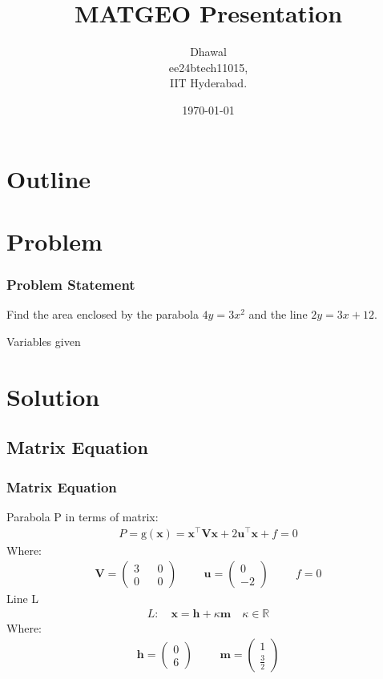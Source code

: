 \documentclass{beamer}
\title{MATGEO Presentation}
\author{Dhawal \\ ee24btech11015,\\IIT Hyderabad.}
\date{\today}
\providecommand{\brak}[1]{\ensuremath{\left(#1\right)}}
\theoremstyle{remark}
\newcommand{\myvec}[1]{\ensuremath{\begin{pmatrix}#1\end{pmatrix}}}
\let\vec\mathbf
\numberwithin{equation}{section}
\begin{document}
\begin{frame}
\titlepage
\end{frame}

\section*{Outline}
\begin{frame}
\tableofcontents
\end{frame}
\section{Problem}
\begin{frame}
\frametitle{Problem Statement}
%
 Find the area enclosed by the parabola $4y = 3x^2$ and the line $2y = 3x+12$. 
 \begin{table}[h!]    
  \centering
  
  \caption{Variables given}
  \label{tab 1.4.9.2}
\end{table}


\end{frame}

\section{Solution}
\subsection{Matrix Equation}
\begin{frame}
\frametitle{Matrix Equation}
Parabola P in terms of matrix:
\begin{align}
P=\text{g}\brak{\vec{x}}=\vec{x}^{\top}\vec{V}\vec{x}+2\vec{u}^{\top}\vec{x}+f=0
\end{align}
Where:
\begin{align}
\vec{V}=\myvec{3&&0\\0&&0} \hspace{1cm} \vec{u}=\myvec{0\\-2} \hspace{1cm} f=0
\end{align}
Line L
\begin{align}
	L: \quad \vec{x} = \vec{h} + \kappa \vec{m} \quad \kappa \in \mathbb{R}
\end{align}
Where:
\begin{align}
\vec{h}=\myvec{0\\6} \hspace{1cm} \vec{m}=\myvec{1\\\frac{3}{2}}
\end{align}

\end{frame}
\end{document}
